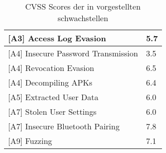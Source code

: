 \begin{table}[H]
\begin{tabular}{|l|l|}
{[}A3{]} Access Log Evasion                 & \cellcolor{orange}5.7            \\ \hline
\rowcolor{light-gray}
{[}A4{]} Insecure Password Transmission     & \cellcolor{yellow}3.5            \\ \hline
{[}A4{]} Revocation Evasion                 & \cellcolor{orange}6.5            \\ \hline
\rowcolor{light-gray}
{[}A4{]} Decompiling APKs                   & \cellcolor{orange}6.4            \\ \hline
{[}A5{]} Extracted User Data                & \cellcolor{orange}6.0            \\ \hline
\rowcolor{light-gray}
{[}A7{]} Stolen User Settings               & \cellcolor{orange}6.0            \\ \hline
{[}A7{]} Insecure Bluetooth Pairing         & \cellcolor{redorange}7.8            \\ \hline
\rowcolor{light-gray}
{[}A9{]} Fuzzing                            & \cellcolor{redorange}7.1            \\ \hline
        \end{tabular}
        \caption[CVSS Scores des Prototypen]{CVSS Scores der in  vorgestellten schwachstellen}
        \label{tab:vulns_cvss_short}
    \end{table}
